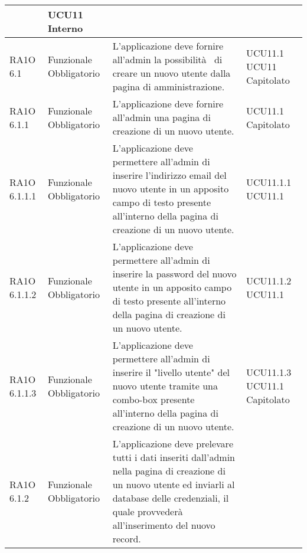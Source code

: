 \begin{center}
\begin{longtable}{ | l | p{2cm} | p{5cm} | p{1.7cm} |}
 &  UCU11 \newline  Interno \newline  \\ \hline      
        RA1O 6.1  & Funzionale \newline  Obbligatorio  & L'applicazione deve fornire all'admin la possibilità  di creare un nuovo utente dalla pagina di amministrazione. &  UCU11.1 \newline  UCU11 \newline  Capitolato \newline  \\ \hline      
        RA1O 6.1.1  & Funzionale \newline  Obbligatorio  & L'applicazione deve fornire all'admin una pagina di creazione di un nuovo utente. &  UCU11.1 \newline  Capitolato \newline  \\ \hline      
        RA1O 6.1.1.1  & Funzionale \newline  Obbligatorio  & L'applicazione deve permettere all'admin di inserire l'indirizzo email del nuovo utente in un apposito campo di testo presente all'interno della pagina di creazione di un nuovo utente.
 &  UCU11.1.1 \newline  UCU11.1 \newline  \\ \hline      
        RA1O 6.1.1.2 & Funzionale \newline  Obbligatorio  & L'applicazione deve permettere all'admin di inserire la password del nuovo utente in un apposito campo di testo presente all'interno della pagina di creazione di un nuovo utente. &  UCU11.1.2 \newline  UCU11.1 \newline  \\ \hline      
        RA1O 6.1.1.3  & Funzionale \newline  Obbligatorio  & L'applicazione deve permettere all'admin di inserire il "livello utente" del nuovo utente tramite una combo-box presente all'interno della pagina di creazione di un nuovo utente. &  UCU11.1.3 \newline  UCU11.1 \newline  Capitolato \newline  \\ \hline      
        RA1O 6.1.2  & Funzionale \newline  Obbligatorio  & L'applicazione deve prelevare tutti i dati inseriti dall'admin nella pagina di creazione di un nuovo utente ed inviarli al database delle credenziali, il quale provvederà  all'inserimento del nuovo record.

\end{longtable}
\end{center}
